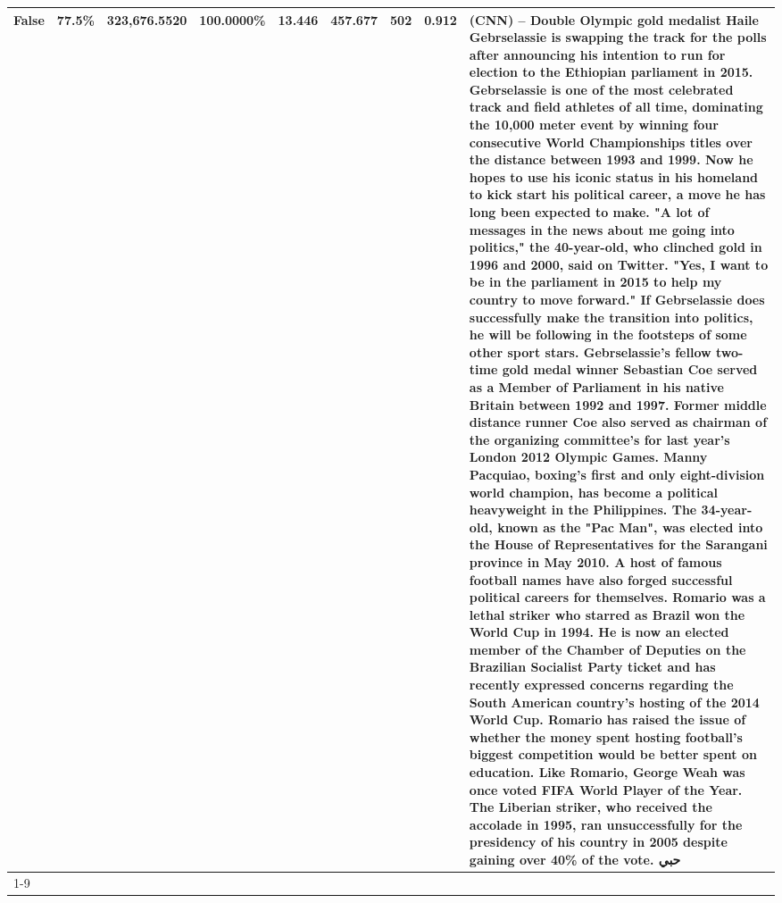 \begin{table}[H]
{\begin{tabular}{lllrlllll}
False & 77.5\% & 323,676.5520 & \bfseries \color{red} 100.0000\% & 13.446 & 457.677 & 502 & 0.912 & (CNN) -- Double Olympic gold medalist Haile Gebrselassie is swapping the track for the polls after announcing his intention to run for election to the Ethiopian parliament in 2015. Gebrselassie is one of the most celebrated track and field athletes of all time, dominating the 10,000 meter event by winning four consecutive World Championships titles over the distance between 1993 and 1999. Now he hopes to use his iconic status in his homeland to kick start his political career, a move he has long been expected to make. "A lot of messages in the news about me going into politics," the 40-year-old, who clinched gold in 1996 and 2000, said on Twitter. "Yes, I want to be in the parliament in 2015 to help my country to move forward." If Gebrselassie does successfully make the transition into politics, he will be following in the footsteps of some other sport stars. Gebrselassie's fellow two-time gold medal winner Sebastian Coe served as a Member of Parliament in his native Britain between 1992 and 1997. Former middle distance runner Coe also served as chairman of the organizing committee's for last year's London 2012 Olympic Games. Manny Pacquiao, boxing's first and only eight-division world champion, has become a political heavyweight in the Philippines. The 34-year-old, known as the "Pac Man", was elected into the House of Representatives for the Sarangani province in May 2010. A host of famous football names have also forged successful political careers for themselves. Romario was a lethal striker who starred as Brazil won the World Cup in 1994. He is now an elected member of the Chamber of Deputies on the Brazilian Socialist Party ticket and has recently expressed concerns regarding the South American country's hosting of the 2014 World Cup. Romario has raised the issue of whether the money spent hosting football's biggest competition would be better spent on education. Like Romario, George Weah was once voted FIFA World Player of the Year. The Liberian striker, who received the accolade in 1995, ran unsuccessfully for the presidency of his country in 2005 despite gaining over 40\% of the vote. حبي \\
\cline{1-9}

\end{tabular}}
\end{table}
